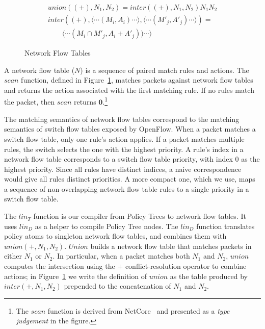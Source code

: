 \begin{figure}[t]
\begin{displaymath}
\begin{array}{l}
\mathit{union}((+),N_1,N_2) = \mathit{inter}((+),N_1,N_2) N_1 N_2 \\
\mathit{inter}((+),\langle\cdots(M_i,A_i)\cdots\rangle, \langle\cdots(M'_j,A'_j)\cdots\rangle) = \\
\qquad \langle\cdots(M_i \cap M'_j,A_i+A'_j))\cdots\rangle
\end{array}
\end{displaymath}

\caption{Network Flow Tables}
\label{f:intermediate}

\end{figure}

A network flow table ($N$) is a sequence of paired match rules
and actions. The $\mathit{scan}$ function, defined in
Figure~\ref{f:intermediate}, matches packets against network flow
tables and returns the action associated with the first matching rule. If
no rules match the packet, then $\mathit{scan}$ returns $\textbf{0}$.\footnote{The
  $\mathit{scan}$ function is derived from 
  NetCore~\cite{Monsanto:2012} and presented as a \emph{type judgement}
  in the figure.}

The matching semantics of network flow tables correspond to the
matching semantics of switch flow tables exposed by OpenFlow.  When a
packet matches a switch flow table, only one rule's action applies. If a
packet matches multiple rules, the switch selects the one with the
highest priority.  A rule's index in a network flow table corresponds
to a switch flow table priority, with index $0$ as the highest
priority. Since all rules have distinct indices, a naive
correspondence would give all rules distinct priorities. A more
compact one, which we use, maps a sequence of
non-overlapping network flow table rules to a single priority in a
switch flow table.

The $\mathit{lin}_T$ function is our compiler from Policy Trees to
network flow tables. It uses $\mathit{lin}_D$ as a helper to compile
Policy Tree nodes.  The $\mathit{lin}_D$ function translates policy
atoms to singleton network flow tables, and combines them with
$\mathit{union(+,N_1,N_2)}$.  $\mathit{Union}$ builds a network flow table that
matches packets in either $N_1$ or $N_2$. In particular, when a packet
matches both $N_1$ and $N_2$, $\mathit{union}$ computes the intersection
using the $+$ conflict-resolution operator to combine
actions; in Figure~\ref{f:intermediate} we write the definition of
$\mathit{union}$ as the table produced by $\mathit{inter(+,N_1,N_2)}$ prepended
to the concatenation of $N_1$ and $N_2$.

